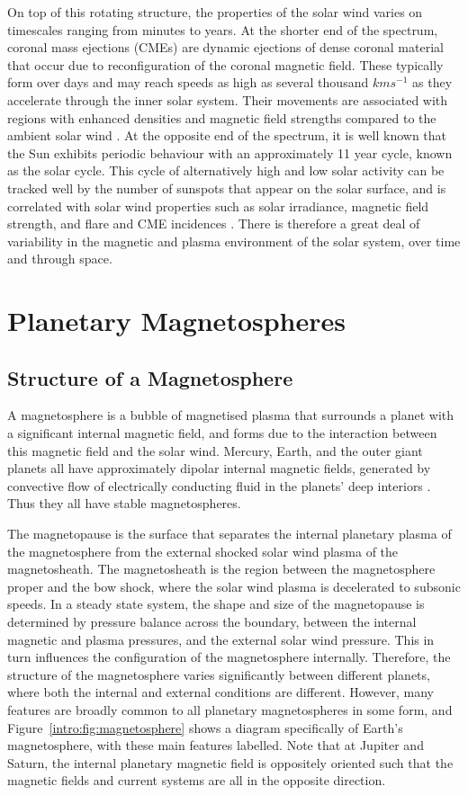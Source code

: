 On top of this rotating structure, the properties of the solar wind varies on timescales ranging from minutes to years. At the shorter end of the spectrum, coronal mass ejections (CMEs) are dynamic ejections of dense coronal material that occur due to reconfiguration of the coronal magnetic field. These typically form over days and may reach speeds as high as several thousand $\si{kms^{-1}}$ as they accelerate through the inner solar system. Their movements are associated with regions with enhanced densities and magnetic field strengths compared to the ambient solar wind \citep{odstrcil1999}. At the opposite end of the spectrum, it is well known that the Sun exhibits periodic behaviour with an approximately 11 year cycle, known as the solar cycle. This cycle of alternatively high and low solar activity can be tracked well by the number of sunspots that appear on the solar surface, and is correlated with solar wind properties such as solar irradiance, magnetic field strength, and flare and CME incidences \citep{hathaway2015}. There is therefore a great deal of variability in the magnetic and plasma environment of the solar system, over time and through space.

\section{Planetary Magnetospheres}
\subsection{Structure of a Magnetosphere}
A magnetosphere is a bubble of magnetised plasma that surrounds a planet with a significant internal magnetic field, and forms due to the interaction between this magnetic field and the solar wind. Mercury, Earth, and the outer giant planets all have approximately dipolar internal magnetic fields, generated by convective flow of electrically conducting fluid in the planets' deep interiors \citep{kivelson2014book}. Thus they all have stable magnetospheres.

The magnetopause is the surface that separates the internal planetary plasma of the magnetosphere from the external shocked solar wind plasma of the magnetosheath. The magnetosheath is the region between the magnetosphere proper and the bow shock, where the solar wind plasma is decelerated to subsonic speeds. In a steady state system, the shape and size of the magnetopause is determined by pressure balance across the boundary, between the internal magnetic and plasma pressures, and the external solar wind pressure. This in turn influences the configuration of the magnetosphere internally. Therefore, the structure of the magnetosphere varies significantly between different planets, where both the internal and external conditions are different. However, many features are broadly common to all planetary magnetospheres in some form, and Figure~\ref{intro:fig:magnetosphere} shows a diagram specifically of Earth's magnetosphere, with these main features labelled. Note that at Jupiter and Saturn, the internal planetary magnetic field is oppositely oriented such that the magnetic fields and current systems are all in the opposite direction.

